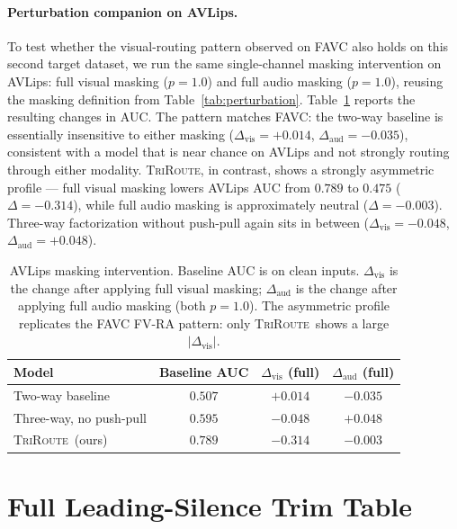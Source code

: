 \documentclass{article}
\newcommand{\method}{\textsc{TriRoute}}
\begin{document}
\paragraph{Perturbation companion on AVLips.}
To test whether the visual-routing pattern observed on FAVC also holds on this second target dataset, we run the same single-channel masking intervention on AVLips: full visual masking ($p=1.0$) and full audio masking ($p=1.0$), reusing the masking definition from Table~\ref{tab:perturbation}. Table~\ref{tab:avlips_perturbation} reports the resulting changes in AUC. The pattern matches FAVC: the two-way baseline is essentially insensitive to either masking ($\Delta_\mathrm{vis}=+0.014$, $\Delta_\mathrm{aud}=-0.035$), consistent with a model that is near chance on AVLips and not strongly routing through either modality. \method, in contrast, shows a strongly asymmetric profile --- full visual masking lowers AVLips AUC from $0.789$ to $0.475$ ($\Delta=-0.314$), while full audio masking is approximately neutral ($\Delta=-0.003$). Three-way factorization without push-pull again sits in between ($\Delta_\mathrm{vis}=-0.048$, $\Delta_\mathrm{aud}=+0.048$).

\begin{table}[h]
    \centering
    \caption{AVLips masking intervention. Baseline AUC is on clean inputs. $\Delta_\mathrm{vis}$ is the change after applying full visual masking; $\Delta_\mathrm{aud}$ is the change after applying full audio masking (both $p=1.0$). The asymmetric profile replicates the FAVC FV-RA pattern: only \method\ shows a large $|\Delta_\mathrm{vis}|$.}
    \label{tab:avlips_perturbation}
    \small
    \begin{tabular}{lccc}
        \toprule
        Model & Baseline AUC & $\Delta_\mathrm{vis}$ (full) & $\Delta_\mathrm{aud}$ (full) \\
        \midrule
        Two-way baseline        & $0.507$ & $+0.014$ & $-0.035$ \\
        Three-way, no push-pull & $0.595$ & $-0.048$ & $+0.048$ \\
        \method\ (ours)         & $\mathbf{0.789}$ & $\mathbf{-0.314}$ & $-0.003$ \\
        \bottomrule
    \end{tabular}
\end{table}

\section{Full Leading-Silence Trim Table}
\label{app:silence_full}
\end{document}

